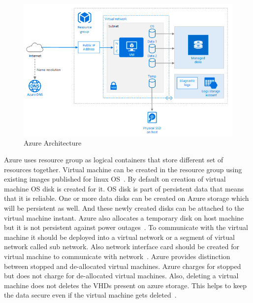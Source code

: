  \begin{figure}[!ht]
        \centering\includegraphics[width=\columnwidth]
        {image/azure-architecture.PNG}
        \caption{Azure Architecture}\label{fig:azure-architecture}
\end{figure}

Azure uses resource group as logical containers that store different set of
resources together. Virtual machine can be created in the resource group using
existing images published for linux OS~\cite{hid-sp18-502-azure-archi}. By
default on creation of virtual machine OS disk is created for it. OS disk is
part of persistent data that means that it is reliable. One or more data disks
can be created on Azure storage which will be persistent as well. And these
newly created disks can be attached to the virtual machine instant. Azure also
allocates a temporary disk on host machine but it is not persistent against
power outages~\cite{hid-sp18-502-azure-archi}. To communicate
with the virtual machine it should be deployed into a virtual network or a
segment of virtual network called sub network. Also network interface card
should be created for virtual machine to communicate with
network~\cite{hid-sp18-502-azure-archi}. Azure provides distinction between
stopped and de-allocated virtual machines. Azure charges for stopped but does
not charge for de-allocated virtual machines. Also, deleting a virtual machine
does not deletes the VHDs present on azure storage. This helps to keep the data
secure even if the virtual machine gets
deleted~\cite{hid-sp18-502-azure-archi}.


